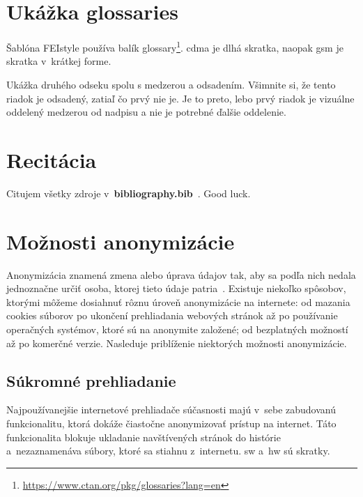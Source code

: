 \section{Ukážka glossaries}
Šablóna FEIstyle používa balík glossary\footnote{\url{https://www.ctan.org/pkg/glossaries?lang=en}}.
\acrfull{cdma} je dlhá skratka, naopak \acrshort{gsm} je skratka v~krátkej forme.

Ukážka druhého odseku spolu s medzerou a odsadením. Všimnite si, že tento
riadok je odsadený, zatiaľ čo prvý nie je. Je to preto, lebo prvý riadok je
vizuálne oddelený medzerou od nadpisu a nie je potrebné ďalšie oddelenie.
\section{Recitácia}
Citujem všetky zdroje v~\textbf{bibliography.bib}~\cite{t00, t01, t02, t03, kniha, kniha2, kniha3, small, big, cs, koll, kap, tug, knuth, zbornik, prispevok}. \newline Good luck.
\section{Možnosti anonymizácie}
Anonymizácia znamená zmena alebo úprava údajov tak, aby sa podľa nich nedala jednoznačne určiť osoba, ktorej tieto údaje patria~\cite{t01}. Existuje niekoľko spôsobov, ktorými môžeme dosiahnuť rôznu úroveň anonymizácie na internete: od mazania cookies súborov po ukončení prehliadania webových stránok až po používanie operačných systémov, ktoré sú na anonymite založené; od bezplatných možností až po komerčné verzie.  
\newline Nasleduje priblíženie niektorých možnosti anonymizácie.

\subsection{Súkromné prehliadanie}
Najpoužívanejšie internetové prehliadače súčasnosti majú v~sebe zabudovanú funkcionalitu, ktorá dokáže čiastočne anonymizovať prístup na internet. Táto funkcionalita blokuje ukladanie navštívených stránok do histórie a~nezaznamenáva súbory, ktoré sa stiahnu z~internetu. \acrshort{sw} a~\acrlong{hw} sú skratky.

